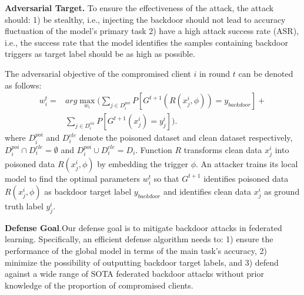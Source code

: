 \noindent\textbf{Adversarial Target.} To ensure the effectiveness of the attack, the attack should: 1) be stealthy, i.e., injecting the backdoor should not lead to accuracy fluctuation of the model's primary task 2) have a high attack success rate (ASR), i.e., the success rate that the model identifies the samples containing backdoor triggers as target label should be as high as possible.

The adversarial objective of the compromised client $i$ in round $t$ can be denoted as follows:
\begin{equation}%
\begin{split}
w_{i}^ {t} =&arg\max_{w_{i}} ( \sum _{j \in  D_ {i}^ {poi}}  P[  G^ {t+1} (R(  x_ {j}^ {i}  ,  \phi  ))=   y_{backdoor}  ]+\\  &\sum_{j \in  D_ {i}^ {cle}}   P[  G^ {t+1}  (  x_ {j}^ {i}  )=  y_ {j}^ {i}  ]).
\end{split}
\end{equation}
where $D_ {i}^ {poi}$ and $D_ {i}^ {cle}$ denote the poisoned dataset and clean dataset respectively, $D_ {i}^ {poi}\cap D_ {i}^ {cle}=\emptyset $ and $D_ {i}^ {poi}\cup  D_ {i}^ {cle}=D_{i} $. Function $R$ transforms clean data $ x_ {j}^ {i}$ into poisoned data $R(  x_ {j}^ {i}, \phi)$ by embedding the trigger $\phi$. An attacker trains its local model to find the optimal parameters $w_{i}^ {t}$ so that $G^ {t+1}$ identifies poisoned data $R(  x_ {j}^ {i},  \phi  )$ as backdoor target label $y_{backdoor}$ and identifies clean data $ x_ {j}^ {i}$ as ground truth label $y_ {j}^ {i}$.

\noindent\textbf{Defense Goal}.Our defense goal is to mitigate backdoor attacks in federated learning. Specifically, an efficient defense algorithm needs to: 1) ensure the performance of the global model in terms of the main task's accuracy, 2) minimize the possibility of outputting backdoor target labels, and 3) defend against a wide range of SOTA federated backdoor attacks without prior knowledge of the proportion of compromised clients.
